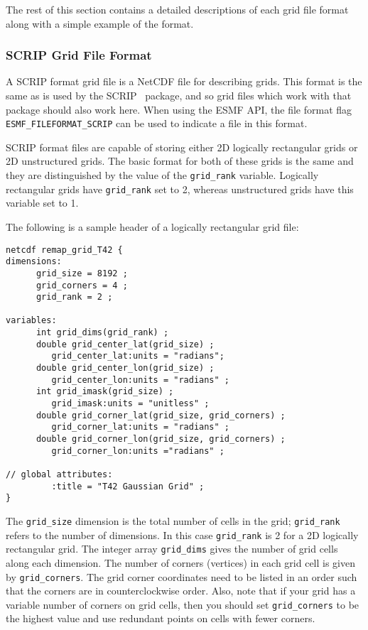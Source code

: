  The rest of this section contains a detailed descriptions of each grid file format along with a simple example of the format. 

\subsubsection{SCRIP Grid File Format}\label{sec:fileformat:scrip}

A SCRIP format grid file is a NetCDF file for describing grids. This format is the same as is used by the SCRIP~\cite{ref:SCRIP}
package, and so grid files which work with that package should also work here.  
When using the ESMF API, the file format flag {\tt ESMF\_FILEFORMAT\_SCRIP} can be used to indicate a file in this format.

SCRIP format files are capable of storing either 2D logically rectangular
grids or 2D unstructured grids. The basic format for both of these grids is the same and they are distinguished by the
value of the {\tt grid\_rank} variable. Logically rectangular grids have {\tt grid\_rank} set to 2,
whereas unstructured grids have this variable set to 1.

The following is a sample header of a logically rectangular grid file:

\begin{verbatim}
netcdf remap_grid_T42 {
dimensions:
      grid_size = 8192 ;
      grid_corners = 4 ;
      grid_rank = 2 ;

variables:
      int grid_dims(grid_rank) ;
      double grid_center_lat(grid_size) ;
         grid_center_lat:units = "radians";
      double grid_center_lon(grid_size) ;
         grid_center_lon:units = "radians" ;
      int grid_imask(grid_size) ;
         grid_imask:units = "unitless" ;
      double grid_corner_lat(grid_size, grid_corners) ;
         grid_corner_lat:units = "radians" ;
      double grid_corner_lon(grid_size, grid_corners) ;
         grid_corner_lon:units ="radians" ;

// global attributes:
         :title = "T42 Gaussian Grid" ;
}
\end{verbatim}

The {\tt grid\_size} dimension is the total number of cells in the grid; {\tt grid\_rank} refers to the
number of dimensions. In this case {\tt grid\_rank} is 2 for a 2D logically rectangular grid.
The integer array {\tt grid\_dims} gives the number of grid cells along each dimension.
The number of corners (vertices) in each grid cell is given by {\tt grid\_corners}.
The grid corner coordinates need to be listed in an order such that the corners are in counterclockwise
order.  Also, note that if your grid has a variable number of corners on grid cells, then
you should set {\tt grid\_corners} to be the highest value and use redundant points
on cells with fewer corners.

